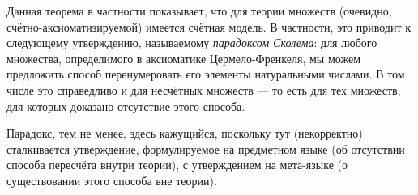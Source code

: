 Данная теорема в частности показывает, что для теории множеств (очевидно,
счётно-аксиоматизируемой) имеется счётная модель. В частности, это приводит
к следующему утверждению, называемому \emph{парадоксом Сколема}:
для любого множества, определимого в аксиоматике Цермело-Френкеля, мы можем 
предложить способ перенумеровать его элементы натуральными числами.
В том числе это справедливо и для несчётных множеств --- то есть для тех
множеств, для которых доказано отсутствие этого способа.

Парадокс, тем не менее, здесь кажущийся, поскольку тут (некорректно)
сталкивается утверждение, формулируемое на предметном языке 
(об отсутствии способа пересчёта внутри теории), с утверждением на мета-языке
(о существовании этого способа вне теории).
